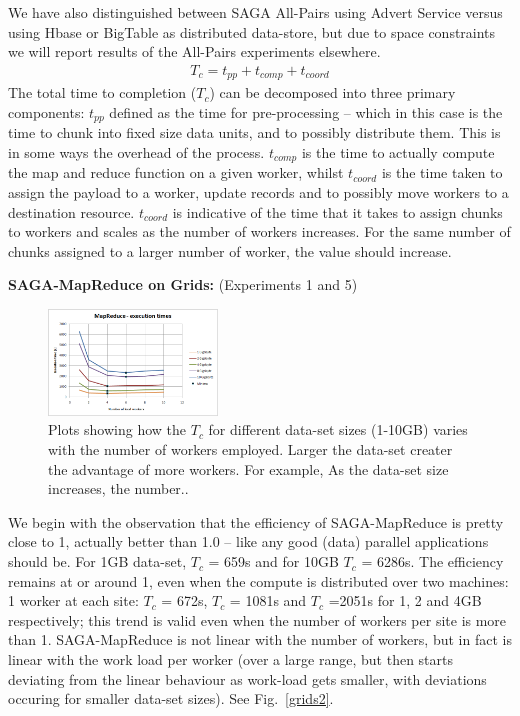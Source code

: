 \documentclass[conference,final]{IEEEtran}
\newcommand{\sagamapreduce }{SAGA-MapReduce }
\newcommand{\tc }{ $T_c$ }
\begin{document}
We have also distinguished between SAGA All-Pairs using Advert Service
versus using Hbase or BigTable as distributed data-store, but due to
space constraints we will report results of the All-Pairs experiments
elsewhere.
\begin{eqnarray}
T_c = t_{pp} + t_{comp} + t_{coord}
\end{eqnarray}
The total time to completion ($T_c$) can be decomposed into three
primary components: $t_{pp}$ defined as the time for pre-processing --
which in this case is the time to chunk into fixed size data units,
and to possibly distribute them. This is in some ways the overhead of
the process.  $t_{comp}$ is the time to actually compute the map and
reduce function on a given worker, whilst $t_{coord}$ is the time
taken to assign the payload to a worker, update records and to
possibly move workers to a destination resource. $t_{coord}$ is
indicative of the time that it takes to assign chunks to workers and
scales as the number of workers increases. For the same number of
chunks assigned to a larger number of worker, the value should
increase.


{\bf SAGA-MapReduce on Grids:} (Experiments 1 and
5) %

\begin{figure}[t]
  \includegraphics[width=0.4\textwidth]{MapReduce_local_executiontime.png}
\caption{Plots showing how the \tc for different data-set sizes
  (1-10GB) varies with the number of workers employed.
  Larger the data-set creater the advantage of more workers. For
  example, As the data-set size increases, the number..}
\label{grids1}
\end{figure}


We begin with the observation that the efficiency of \sagamapreduce is
pretty close to 1, actually better than 1.0 -- like any good (data)
parallel applications should be.  For 1GB data-set, \tc = 659s and for
10GB \tc = 6286s.  The efficiency remains at or around 1, even when
the compute is distributed over two machines: 1 worker at each site:
\tc = 672s, \tc = 1081s and \tc =2051s for 1, 2 and 4GB respectively;
this trend is valid even when the number of workers per site is more
than 1. \sagamapreduce is not linear with the number of workers, but in fact
is linear with the work load per worker (over a large range, but then starts deviating from the linear behaviour as work-load gets smaller, with deviations
occuring for smaller data-set sizes). See Fig.~\ref{grids2}.
\end{document}
